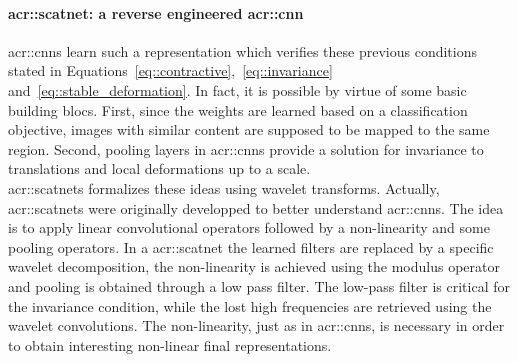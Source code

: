             \paragraph{\gls*{acr::scatnet}: a reverse engineered \gls*{acr::cnn}}
                \glspl{acr::cnn} learn such a representation which verifies these previous conditions stated in Equations~\ref{eq::contractive},~\ref{eq::invariance} and~\ref{eq::stable_deformation}.
                In fact, it is possible by virtue of some basic building blocs.
                First, since the weights are learned based on a classification objective, images with similar content are supposed to be mapped to the same region.
                Second, pooling layers in \glspl{acr::cnn} provide a solution for invariance to translations and local deformations up to a scale.\\

                \glspl{acr::scatnet} formalizes these ideas using wavelet transforms.
                Actually, \glspl{acr::scatnet} were originally developped to better understand \glspl{acr::cnn}.
                The idea is to apply linear convolutional operators followed by a non-linearity and some pooling operators.
                In a \gls{acr::scatnet} the learned filters are replaced by a specific wavelet decomposition, the non-linearity is achieved using the modulus operator and pooling is obtained through a low pass filter.
                The low-pass filter is critical for the invariance condition, while the lost high frequencies are retrieved using the wavelet convolutions.
                The non-linearity, just as in \glspl{acr::cnn}, is necessary in order to obtain interesting non-linear final representations.\\

